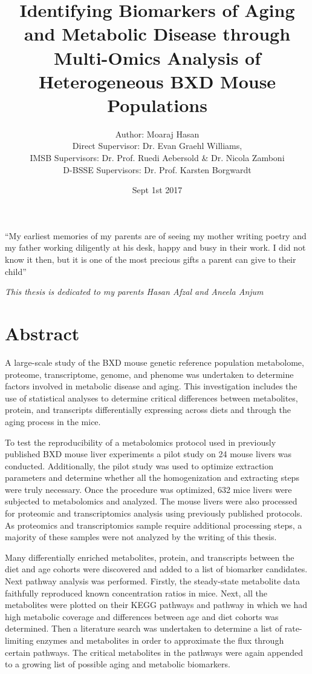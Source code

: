 \documentclass[a4paper,11pt,twoside]{book}
\title{Identifying Biomarkers of Aging and Metabolic Disease through Multi-Omics Analysis of Heterogeneous BXD Mouse Populations}
\author{Author: Moaraj Hasan\\
	Direct Supervisor: Dr. Evan Graehl Williams, \\
	IMSB Supervisors: Dr. Prof. Ruedi Aebersold \& Dr. Nicola Zamboni \\
	D-BSSE Supervisors: Dr. Prof. Karsten Borgwardt }
\date{Sept 1st 2017}
\begin{document}
	
	\maketitle
	\let\cleardoublepage\clearpage
	
	\chapter*{}
	
	\epigraph{“My earliest memories of my parents are of seeing my mother writing poetry and my father working diligently at his desk, happy and busy in their work. I did not know it then, but it is one of the most precious gifts a parent can give to their child”}{\textit{This thesis is dedicated to my parents Hasan Afzal and Aneela Anjum}}
	
	\let\cleardoublepage\clearpage
	
	{
		\tableofcontents{}
	}
	
	\chapter*{Abstract} 

	A large-scale study of the BXD mouse genetic reference population metabolome, proteome, transcriptome, genome, and phenome was undertaken to determine factors involved in metabolic disease and aging. This investigation includes the use of statistical analyses to determine critical differences between metabolites, protein, and transcripts differentially expressing across diets and through the aging process in the mice. 
	
	To test the reproducibility of a metabolomics protocol used in previously published BXD mouse liver experiments a pilot study on 24 mouse livers was conducted. Additionally, the pilot study was used to optimize extraction parameters and determine whether all the homogenization and extracting steps were truly necessary. Once the procedure was optimized, 632 mice livers were subjected to metabolomics and analyzed. The mouse livers were also processed for proteomic and transcriptomics analysis using previously published protocols. As proteomics and transcriptomics sample require additional processing steps, a majority of these samples were not analyzed by the writing of this thesis.
	
	Many differentially enriched metabolites, protein, and transcripts between the diet and age cohorts were discovered and added to a list of biomarker candidates. Next pathway analysis was performed. Firstly, the steady-state metabolite data faithfully reproduced known concentration ratios in mice. Next, all the metabolites were plotted on their KEGG pathways and pathway in which we had high metabolic coverage and differences between age and diet cohorts was determined. Then a literature search was undertaken to determine a list of rate-limiting enzymes and metabolites in order to approximate the flux through certain pathways. The critical metabolites in the pathways were again appended to a growing list of possible aging and metabolic biomarkers. 
\end{document}
